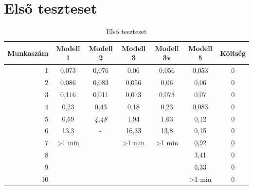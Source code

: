 \documentclass {report}
\begin{document}
   \section{Első teszteset}
   \begin{table}[htpb]
   \centering
   \setlength{\tabcolsep}{4pt}
	\begin{tabular}{r|cccccc}
	   Munkaszám & Modell 1 & Modell 2 & Modell 3 & Modell 3v & Modell 5 & Költség \\ 
	   \hline 
	   1 & 0,073 & 0,076 & 0,06 & 0,056 & 0,053 & 0 \\ 
	   
	   2 & 0,086 & 0,083 & 0,056 & 0,06 & 0,06 & 0 \\ 
	   
	   3 & 0,116 & 0,011 & 0,073 & 0,073 & 0,07 & 0 \\ 
	   
	   4 & 0,23 & 0,43 & 0,18 & 0,23 & 0,083 & 0 \\ 
	  
	   5 & 0,69 & \emph{4,48} & 1,94 & 1,63 & 0,12 & 0 \\ 
	
	   6 & 13,3 & - & 16,33 & 13,8 & 0,15 & 0 \\ 
	   
	   7 & >1 min &  & >1 min & >1 min & 0,92 & 0 \\ 
	   
	   8 &  &  &  &  & 3,41 & 0 \\ 
	   
	   9 &  &  &  &  & 6,33 & 0 \\ 
	   
	   10 &  &  &  &  & >1 min & 0 \\ 
	  
	   \end{tabular} 
	   \label{tab:elsotablazat}
	    \caption{Első teszteset}
   \end{table}
   
\end{document}
